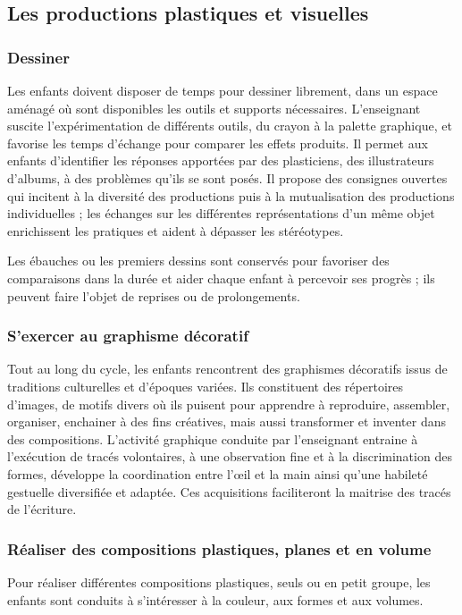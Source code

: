 \subsection{Les productions plastiques et visuelles}
\subsubsection{Dessiner}
Les enfants doivent disposer de temps pour dessiner librement, dans un espace aménagé où sont disponibles les outils et supports nécessaires. L’enseignant suscite l’expérimentation de différents outils, du crayon à la palette graphique, et favorise les temps d’échange pour comparer les effets produits. Il permet aux enfants d'identifier les réponses apportées par des plasticiens, des illustrateurs d’albums, à des problèmes qu'ils se sont posés. Il propose des consignes ouvertes qui incitent à la diversité des productions puis à la mutualisation des productions individuelles ; les échanges sur les différentes représentations d’un même objet enrichissent les pratiques et aident à dépasser les stéréotypes.

Les ébauches ou les premiers dessins sont conservés pour favoriser des comparaisons dans la durée et aider chaque enfant à percevoir ses progrès ; ils peuvent faire l’objet de reprises ou de prolongements. 

\subsubsection{S’exercer au graphisme décoratif}
Tout au long du cycle, les enfants rencontrent des graphismes décoratifs issus de traditions culturelles et d’époques variées. Ils constituent des répertoires d’images, de motifs divers où ils puisent pour apprendre à reproduire, assembler, organiser, enchainer à des fins créatives, mais aussi transformer et inventer dans des compositions. L’activité graphique conduite par l’enseignant entraine à l’exécution de tracés volontaires, à une observation fine et à la discrimination des formes, développe la coordination entre l’œil et la main ainsi qu’une habileté gestuelle diversifiée et adaptée. Ces acquisitions faciliteront la maitrise des tracés de l'écriture.

\subsubsection{Réaliser des compositions plastiques, planes et en volume}
Pour réaliser différentes compositions plastiques, seuls ou en petit groupe, les enfants sont conduits à s'intéresser à la couleur, aux formes et aux volumes. 

